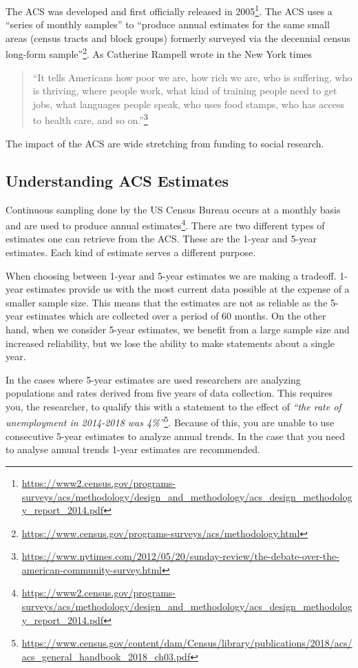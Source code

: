 \documentclass[
]{book}
\begin{document}
The ACS was developed and first officially released in 2005\footnote{\url{https://www2.census.gov/programs-surveys/acs/methodology/design_and_methodology/acs_design_methodology_report_2014.pdf}}. The ACS uses a ``series of monthly samples'' to ``produce annual estimates for the same small areas (census tracts and block groups) formerly surveyed via the decennial census long-form sample''\footnote{\url{https://www.census.gov/programs-surveys/acs/methodology.html}}. As Catherine Rampell wrote in the New York times

\begin{quote}
``It tells Americans how poor we are, how rich we are, who is suffering, who is thriving, where people work, what kind of training people need to get jobs, what languages people speak, who uses food stamps, who has access to health care, and so on.''\footnote{\url{https://www.nytimes.com/2012/05/20/sunday-review/the-debate-over-the-american-community-survey.html}}
\end{quote}

The impact of the ACS are wide stretching from funding to social research.

\hypertarget{understanding-acs-estimates}{%
\subsection{Understanding ACS Estimates}\label{understanding-acs-estimates}}

Continuous sampling done by the US Census Bureau occurs at a monthly basis and are used to produce annual estimates\footnote{\url{https://www2.census.gov/programs-surveys/acs/methodology/design_and_methodology/acs_design_methodology_report_2014.pdf}}. There are two different types of estimates one can retrieve from the ACS. These are the 1-year and 5-year estimates. Each kind of estimate serves a different purpose.

When choosing between 1-year and 5-year estimates we are making a tradeoff. 1-year estimates provide us with the most current data possible at the expense of a smaller sample size. This means that the estimates are not as reliable as the 5-year estimates which are collected over a period of 60 months. On the other hand, when we consider 5-year estimates, we benefit from a large sample size and increased reliability, but we lose the ability to make statements about a single year.

In the cases where 5-year estimates are used researchers are analyzing populations and rates derived from five years of data collection. This requires you, the researcher, to qualify this with a statement to the effect of \emph{``the rate of unemployment in 2014-2018 was 4\%''}\footnote{\url{https://www.census.gov/content/dam/Census/library/publications/2018/acs/acs_general_handbook_2018_ch03.pdf}}. Because of this, you are unable to use consecutive 5-year estimates to analyze annual trends. In the case that you need to analyse annual trends 1-year estimates are recommended.
\end{document}
